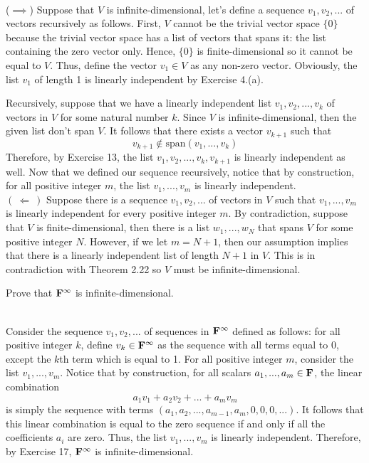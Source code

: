 \begin{solution}
    \\ ($\implies$) Suppose that $V$ is infinite-dimensional, let's define a sequence $v_1, v_2, ...$ of vectors recursively as follows. First, $V$ cannot be the trivial vector space $\{0\}$ because the trivial vector space has a list of vectors that spans it: the list containing the zero vector only. Hence, $\{0\}$ is finite-dimensional so it cannot be equal to $V$. Thus, define the vector $v_1 \in V$ as any non-zero vector. Obviously, the list $v_1$ of length 1 is linearly independent by Exercise 4.(a). 

    Recursively, suppose that we have a linearly independent list $v_1, v_2, ..., v_k$ of vectors in $V$ for some natural number $k$. Since $V$ is infinite-dimensional, then the given list don't span $V$. It follows that there exists a vector $v_{k+1}$ such that 
    $$v_{k+1} \notin \text{span}(v_1, ..., v_k)$$
    Therefore, by Exercise 13, the list $v_1, v_2, ..., v_k, v_{k+1}$ is linearly independent as well. Now that we defined our sequence recursively, notice that by construction, for all positive integer $m$, the list $v_1, ..., v_m$ is linearly independent. \\

    \noindent $( \ \Longleftarrow \ )$ Suppose there is a sequence $v_1, v_2, ...$ of vectors in $V$ such that $v_1, ..., v_m$ is linearly independent for every positive integer $m$. By contradiction, suppose that $V$ is finite-dimensional, then there is a list $w_1, ..., w_N$ that spans $V$ for some positive integer $N$. However, if we let $m = N+1$, then our assumption implies that there is a linearly independent list of length $N+1$ in $V$. This is in contradiction with Theorem 2.22 so $V$ must be infinite-dimensional.\\
\end{solution}

\begin{exercise}
    Prove that $\mathbf{F}^{\infty}$ is infinite-dimensional. \\
\end{exercise}

\begin{solution}
    \\ Consider the sequence $v_1, v_2, ...$ of sequences in $\mathbf{F}^{\infty}$ defined as follows: for all positive integer $k$, define $v_k \in \mathbf{F}^{\infty}$ as the sequence with all terms equal to 0, except the $k$th term which is equal to 1. For all positive integer $m$, consider the list $v_1, ..., v_m$. Notice that by construction, for all scalars $a_1, ..., a_m \in \mathbf{F}$, the linear combination
    $$a_1 v_1 + a_2 v_2 + ... + a_m v_m$$
    is simply the sequence with terms $(a_1, a_2, ..., a_{m-1}, a_m, 0, 0, 0, ...)$. It follows that this linear combination is equal to the zero sequence if and only if all the coefficients $a_i$ are zero. Thus, the list $v_1, ..., v_m$ is linearly independent. Therefore, by Exercise 17, $\mathbf{F}^{\infty}$ is infinite-dimensional. \\
\end{solution}

